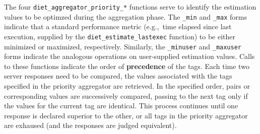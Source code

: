 The four
\texttt{diet\_aggregator\_priority\_*} functions serve to identify the
estimation values to be optimzed during the aggregation phase.  The
\texttt{\_min} and \texttt{\_max} forms indicate that a standard
performance metric (e.g.,~time elapsed since last execution, supplied
by the \texttt{diet\_estimate\_lastexec} function) to be either
minimized or maximized, respectively.  Similarly, the
\texttt{\_minuser} and \texttt{\_maxuser} forms indicate the analogous
operations on user-supplied estimation values.  Calls to these
functions indicate the order of \textbf{precedence} of the tags.  Each
time two server responses need to be compared, the values associated
with the tags specified in the priority aggregator are retrieved.  In
the specified order, pairs or corresponding values are successively
compared, passing to the next tag only if the values for the current
tag are identical.  This process continues until one response is
declared superior to the other, or all tags in the priority aggregator
are exhaused (and the responses are judged equivalent).




